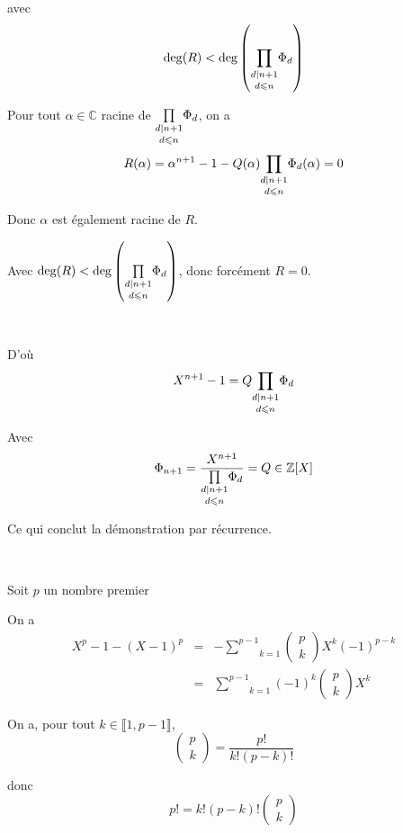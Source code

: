 avec
\[ \deg (R) < \deg \left( \underset{d \leqslant n}{\underset{d | n + 1
   }{\prod}} \Phi_d \right) \]


Pour tout $\alpha \in \mathbb{C}$ racine de $\underset{d \leqslant
n}{\underset{d | n + 1 }{\prod}} \Phi_d$, on a
\[ R (\alpha) = \alpha^{n + 1} - 1 - Q (\alpha) \underset{d \leqslant
   n}{\underset{d | n + 1 }{\prod}} \Phi_d (\alpha) = 0 \]


Donc $\alpha$ est {\'e}galement racine de $R$.

Avec $\deg (R) < \deg \left( \underset{d \leqslant n}{\underset{d | n + 1
}{\prod}} \Phi_d \right)$, donc forc{\'e}ment $R = 0$.

\

D'o{\`u}
\[ X^{n + 1} - 1 = Q \underset{d \leqslant n}{\underset{d | n + 1
   }{\prod}} \Phi_d \]


Avec
\[ \Phi_{n + 1} = \frac{X^{n + 1}}{\underset{d \leqslant n}{\underset{d | n +
   1 }{\prod}} \Phi_d} = Q \in \mathbb{Z} [X] \]


Ce qui conclut la d{\'e}monstration par r{\'e}currence.

\

 Soit $p$ un nombre premier

 On a
\begin{eqnarray*}
  X^p - 1 - (X - 1)^p & = & - \underset{k = 1}{\overset{p - 1}{\sum}} \left(
  \begin{array}{c}
    p\\
    k
  \end{array} \right) X^k (- 1)^{p - k}\\
  & = & \underset{k = 1}{\overset{p - 1}{\sum}} (- 1)^k \left(
  \begin{array}{c}
    p\\
    k
  \end{array} \right) X^k
\end{eqnarray*}


On a, pour tout $k \in \llbracket 1, p - 1 \rrbracket$,
\[ \left( \begin{array}{c}
     p\\
     k
   \end{array} \right) = \frac{p!}{k! (p - k) !} \]


donc
\[ p! = k! (p - k) ! \left( \begin{array}{c}
     p\\
     k
   \end{array} \right) \]


